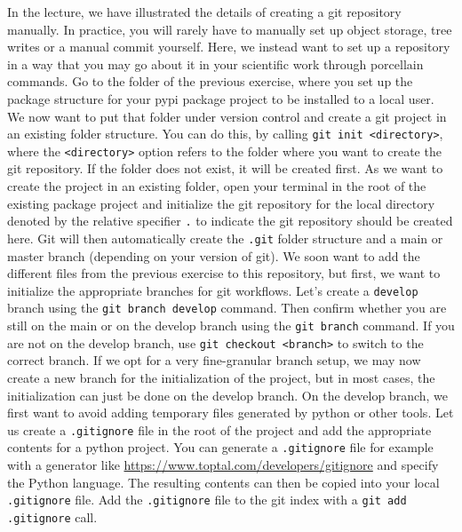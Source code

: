 \documentclass[]{erlangen-problemset}
\begin{document}
\begin{problem}[title={Setting up a git repository the simple way}]
\noindent
In the lecture, we have illustrated the details of creating a git repository manually.
In practice, you will rarely have to manually set up object storage, tree writes or a manual commit yourself. 
Here, we instead want to set up a repository in a way that you may go about it in your scientific work through porcellain commands.
\Question Go to the folder of the previous exercise, where you set up the package structure for your pypi package project to be installed to a local user. 
We now want to put that folder under version control and create a git project in an existing folder structure. 
You can do this, by calling \texttt{git init <directory>}, where the \texttt{<directory>} option refers to the folder where you want to create the git repository. 
If the folder does not exist, it will be created first. 
As we want to create the project in an existing folder, open your terminal in the root of the existing package project and initialize the git repository for the local directory denoted by the relative specifier \texttt{.} to indicate the git repository should be created here. 
Git will then automatically create the \texttt{.git} folder structure and a main or master branch (depending on your version of git).
\Question We soon want to add the different files from the previous exercise to this repository, but first, we want to initialize the appropriate branches for git workflows.
Let's create a \texttt{develop} branch using the \texttt{git branch develop} command.
Then confirm whether you are still on the main or on the develop branch using the \texttt{git branch} command. 
If you are not on the develop branch, use \texttt{git checkout <branch>} to switch to the correct branch.
If we opt for a very fine-granular branch setup, we may now create a new branch for the initialization of the project, but in most cases, the initialization can just be done on the develop branch. 
\Question On the develop branch, we first want to avoid adding temporary files generated by python or other tools. 
Let us create a \texttt{.gitignore} file in the root of the project and add the appropriate contents for a python project. 
You can generate a \texttt{.gitignore} file for example with a generator like \url{https://www.toptal.com/developers/gitignore} and specify the Python language. 
The resulting contents can then be copied into your local \texttt{.gitignore} file. 
Add the \texttt{.gitignore} file to the git index with a \texttt{git add .gitignore} call. 

\end{problem}
\end{document}

